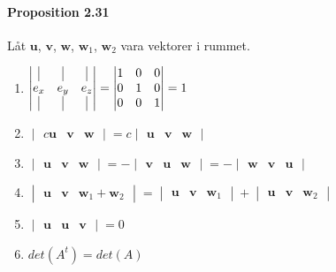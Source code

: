 \paragraph{Proposition 2.31} Låt $\bm{u}$, $\bm{v}$, $\bm{w}$, $\bm{w}_{1}$, $\bm{w}_{2}$ vara vektorer i rummet.
\begin{enumerate}
    \item 
        $\begin{vmatrix}
            \vline&\vline&\vline\\
            e_{x}&e_{y}&e_{z}\\
            \vline&\vline&\vline
        \end{vmatrix} = 
        \begin{vmatrix}
            1&0&0\\
            0&1&0\\
            0&0&1
        \end{vmatrix}=1$

    \item 
        $\begin{vmatrix}
            c\bm{u}&\bm{v}&\bm{w}
        \end{vmatrix}=c\begin{vmatrix}
            \bm{u}&\bm{v}&\bm{w}
        \end{vmatrix}$

    \item 
        $\begin{vmatrix}
            \bm{u}&\bm{v}&\bm{w}
        \end{vmatrix}=
        -\begin{vmatrix}
            \bm{v}&\bm{u}&\bm{w}
        \end{vmatrix}=
        -\begin{vmatrix}
            \bm{w}&\bm{v}&\bm{u}
        \end{vmatrix}$

    \item 
        $\begin{vmatrix}
            \bm{u}&\bm{v}&\bm{w}_{1}+\bm{w}_{2}
        \end{vmatrix}=
        \begin{vmatrix}
            \bm{u}&\bm{v}&\bm{w}_{1}
        \end{vmatrix}+
        \begin{vmatrix}
            \bm{u}&\bm{v}&\bm{w}_{2}
        \end{vmatrix}$

    \item 
        $\begin{vmatrix}
            \bm{u}&\bm{u}&\bm{v}
        \end{vmatrix}=0$
    \item $det(A^{t})=det(A)$
\end{enumerate}

